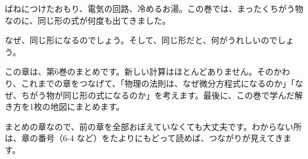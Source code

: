 \begin{hatena}
\noindent\begin{minipage}[c]{0.5\linewidth}
\raggedright
ばねにつけたおもり、電気の回路、冷めるお湯。この巻では、まったくちがう物なのに、同じ形の式が何度も出てきました。

なぜ、同じ形になるのでしょう。そして、同じ形だと、何がうれしいのでしょう。
\end{minipage}\hfill
\begin{minipage}[c]{0.46\linewidth}
\centering
{}
\end{minipage}
\end{hatena}

\noindent この章は、第6巻のまとめです。新しい計算はほとんどありません。そのかわり、これまでの章をつなげて、「物理の法則は、なぜ微分方程式になるのか」「なぜ、ちがう物が同じ形の式になるのか」を考えます。最後に、この巻で学んだ解き方を1枚の地図にまとめます。

まとめの章なので、前の章を全部おぼえていなくても大丈夫です。わからない所は、章の番号（6-4 など）をたよりにもどって読めば、つながりが見えてきます。%

